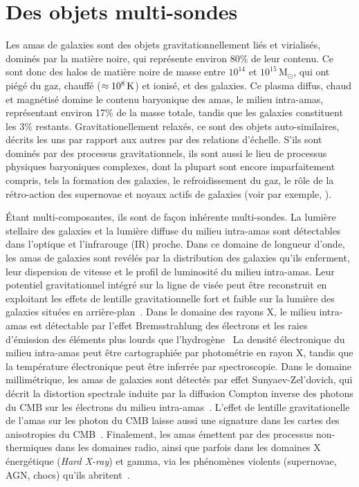 \section{Des objets multi-sondes}
\label{se:multisondes}

Les amas de galaxies sont des objets gravitationnellement liés et
virialisés, dominés par la matière noire, qui représente environ 80\%
de leur contenu. Ce sont donc des halos de matière noire de
masse entre $10^{14}$ et $10^{15}$\,M$_{\odot}$, qui ont piégé du gaz,
chauffé ($\approx 10^{8}\,\rm{K}$) et ionisé, et des galaxies. Ce
plasma diffus, chaud et magnétisé domine
le contenu baryonique des amas, le milieu
intra-amas, représentant environ 17\% de la masse totale, tandis que
les galaxies constituent les 3\% restants. Gravitationellement
relaxés, ce sont des objets auto-similaires, décrits les uns par
rapport aux autres par des relations d'échelle. S'ils sont dominés par
des processus gravitationnels, ils sont aussi le lieu de processus
physiques baryoniques complexes, dont la plupart sont encore
imparfaitement compris, tels la formation des galaxies, le
refroidissement du gaz, le rôle de la rétro-action des supernovae et
noyaux actifs de galaxies (voir par exemple, \citet{Voit2005}). 

\'Etant multi-composantes, ils sont de façon inhérente multi-sondes.
La lumière stellaire des galaxies et la lumière diffuse du
milieu intra-amas sont détectables dans l'optique et l'infrarouge (IR)
proche. Dans ce domaine de longueur d'onde, les amas de galaxies sont
revélés par la distribution des galaxies qu'ils enferment, leur
dispersion de vitesse et le profil de luminosité du milieu
intra-amas. Leur potentiel gravitationnel intégré sur la ligne de
visée peut être reconstruit en exploitant les effets de lentille
gravitationnelle fort et faible sur la lumière des galaxies situées en
arrière-plan~\citep[ pour une revue]{Bartelmann2010}. Dans le domaine des
rayons X, le milieu intra-amas est détectable par l'effet Bremsstrahlung des
électrons et les raies d'émission des éléments plus lourds que
l'hydrogène~\citep{Sarazin1986} La densité électronique du milieu intra-amas peut être
cartographiée par photométrie en rayon X, tandis que la température
électronique peut être inferrée par spectroscopie. Dans le domaine
millimétrique, les amas de galaxies sont détectés par effet
Sunyaev-Zel'dovich, qui décrit la distortion spectrale induite par la
diffusion Compton inverse des photons du CMB sur les électrons du milieu
intra-amas~\citep{SZ1970}.
L'effet de lentille gravitationelle de l'amas sur les photon du CMB
laisse aussi une signature dans les cartes des anisotropies du
CMB~\citep{Seljak2000}. Finalement, les amas émettent par des
processus non-thermiques dans les domaines radio, ainsi que parfois
dans les domaines X énergétique (\emph{Hard X-ray}) et gamma, via les
phénomènes violents (supernovae, AGN, chocs) qu'ils
abritent~\citep{Rephaeli2008}.

